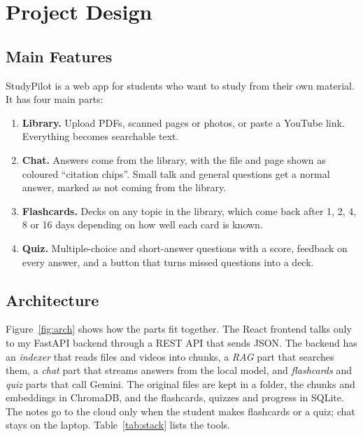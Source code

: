 \documentclass[12pt,a4paper]{report}
\begin{document}
\chapter{Project Design}

\section{Main Features}
StudyPilot is a web app for students who want to study from their own material. It has
four main parts:
\begin{enumerate}
  \item \textbf{Library.} Upload PDFs, scanned pages or photos, or paste a YouTube link.
        Everything becomes searchable text.
  \item \textbf{Chat.} Answers come from the library, with the file and page shown as
        coloured ``citation chips''. Small talk and general questions get a normal answer,
        marked as not coming from the library.
  \item \textbf{Flashcards.} Decks on any topic in the library, which come back after 1, 2,
        4, 8 or 16 days depending on how well each card is known.
  \item \textbf{Quiz.} Multiple-choice and short-answer questions with a score, feedback on
        every answer, and a button that turns missed questions into a deck.
\end{enumerate}

\section{Architecture}
Figure~\ref{fig:arch} shows how the parts fit together. The React frontend talks only to my
FastAPI backend through a REST API that sends JSON. The backend has an \emph{indexer} that
reads files and videos into chunks, a \emph{RAG} part that searches them, a \emph{chat} part
that streams answers from the local model, and \emph{flashcards} and \emph{quiz} parts that
call Gemini. The original files are kept in a folder, the chunks and embeddings in ChromaDB,
and the flashcards, quizzes and progress in SQLite. The notes go to the cloud only when the
student makes flashcards or a quiz; chat stays on the laptop. Table~\ref{tab:stack} lists the
tools.
\end{document}
